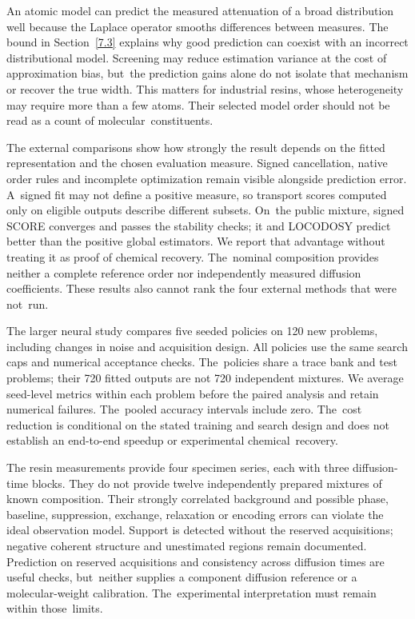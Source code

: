 \documentclass[mathematics,article,accept,moreauthors]{Definitions/mdpi}
\begin{document}
An atomic model can predict the measured attenuation of a broad distribution
well because the Laplace operator smooths differences between measures.
The bound in Section~\ref{7.3} explains why good prediction can coexist with an
incorrect distributional model. Screening may reduce estimation variance at
the cost of approximation bias, but~the prediction gains alone do not isolate
that mechanism or recover the true width. This matters for industrial resins,
whose heterogeneity may require more than a few atoms. Their selected model
order should not be read as a count of molecular~constituents.

The external comparisons show how strongly the result depends on the fitted
representation and the chosen evaluation measure. Signed cancellation, native
order rules and incomplete optimization remain visible alongside prediction
error. A~signed fit may not define a positive measure, so transport scores
computed only on eligible outputs describe different subsets. On~the public
mixture, signed SCORE converges and passes the stability checks; it and LOCODOSY
predict better than the positive global estimators. We report that advantage
without treating it as proof of chemical recovery. The~nominal composition
provides neither a complete reference order nor independently measured diffusion
coefficients. These results also cannot rank the four external methods that
were not~run.

The larger neural study compares five seeded policies on 120 new problems,
including changes in noise and acquisition design. All policies use the same
search caps and numerical acceptance checks. The~policies share a trace bank
and test problems; their 720 fitted outputs are not 720 independent mixtures.
We average seed-level metrics within each problem before the paired analysis
and retain numerical failures. The~pooled accuracy intervals include zero. The~cost
reduction is conditional on the stated training and search design and does
not establish an end-to-end speedup or experimental chemical~recovery.

The resin measurements provide four specimen series, each with three
diffusion-time blocks. They do not provide twelve independently prepared
mixtures of known composition. Their strongly correlated background and possible
phase, baseline, suppression, exchange, relaxation or encoding errors can violate
the ideal observation model. Support is detected without the reserved acquisitions;
negative coherent structure and unestimated regions remain documented.
Prediction on reserved acquisitions and consistency across diffusion times are
useful checks, but~neither supplies a component diffusion reference or a
molecular-weight calibration. The~experimental interpretation must remain within
those~limits.
\end{document}
